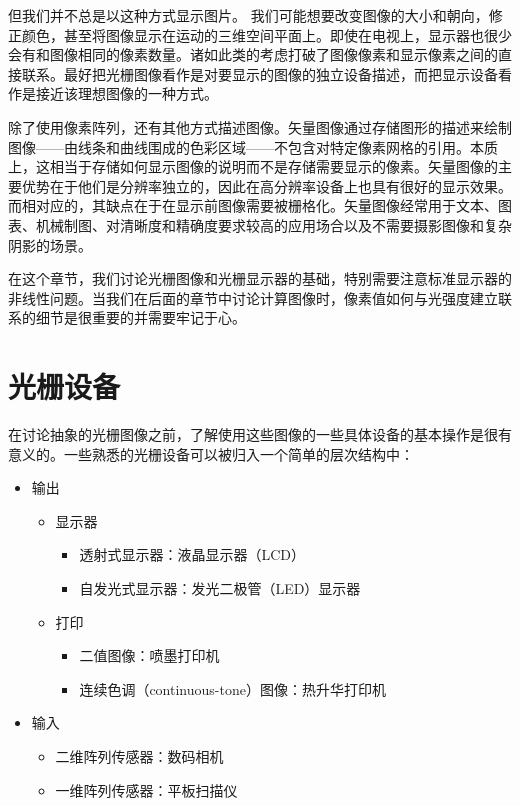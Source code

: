 \documentclass[lang=cn,12pt]{elegantbook}
\begin{document}
但我们并不总是以这种方式显示图片。 我们可能想要改变图像的大小和朝向，修正颜色，甚至将图像显示在运动的三维空间平面上。即使在电视上，显示器也很少会有和图像相同的像素数量。诸如此类的考虑打破了图像像素和显示像素之间的直接联系。最好把光栅图像看作是对要显示的图像的独立设备描述，而把显示设备看作是接近该理想图像的一种方式。

除了使用像素阵列，还有其他方式描述图像。矢量图像通过存储图形的描述来绘制图像——由线条和曲线围成的色彩区域——不包含对特定像素网格的引用。本质上，这相当于存储如何显示图像的说明而不是存储需要显示的像素。矢量图像的主要优势在于他们是分辨率独立的，因此在高分辨率设备上也具有很好的显示效果。而相对应的，其缺点在于在显示前图像需要被栅格化。矢量图像经常用于文本、图表、机械制图、对清晰度和精确度要求较高的应用场合以及不需要摄影图像和复杂阴影的场景。

在这个章节，我们讨论光栅图像和光栅显示器的基础，特别需要注意标准显示器的非线性问题。当我们在后面的章节中讨论计算图像时，像素值如何与光强度建立联系的细节是很重要的并需要牢记于心。


\section{光栅设备}

在讨论抽象的光栅图像之前，了解使用这些图像的一些具体设备的基本操作是很有意义的。一些熟悉的光栅设备可以被归入一个简单的层次结构中：

\begin{itemize}
  \item 输出
\begin{itemize}
  \item 显示器
\begin{itemize}
  \item 透射式显示器：液晶显示器（LCD）
  \item 自发光式显示器：发光二极管（LED）显示器
\end{itemize}
  \item 打印
\begin{itemize}
  \item 二值图像：喷墨打印机
  \item 连续色调（continuous-tone）图像：热升华打印机
\end{itemize}
\end{itemize}
  \item 输入
\begin{itemize}
  \item 二维阵列传感器：数码相机
  \item 一维阵列传感器：平板扫描仪
\end{itemize}
\end{itemize}
\end{document}

